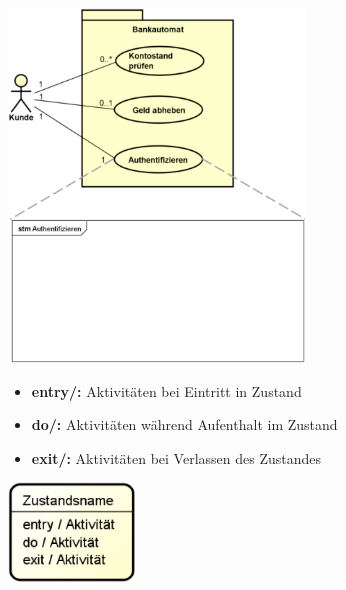 \documentclass[11pt, a4paper]{article}
\begin{document}
\vspace{1em}

\begin{figure}[ht]
    \centering
    \begin{minipage}[h]{0.45\textwidth}
        \raggedright
        \includegraphics[width=0.7\textwidth]{Zustand-00.png}
    \end{minipage}
    \centering
    \begin{minipage}[h]{0.45\textwidth}
        \scriptsize
        \begin{itemize}
            \item \textbf{entry/:} Aktivitäten bei Eintritt in Zustand
            \item \textbf{do/:} Aktivitäten während Aufenthalt im Zustand
            \item \textbf{exit/:} Aktivitäten bei Verlassen des Zustandes
        \end{itemize}
        \centering
        \includegraphics[width=0.3\textwidth]{Zustand-Elemente/0.png}
    \end{minipage}
\end{figure}
\end{document}
